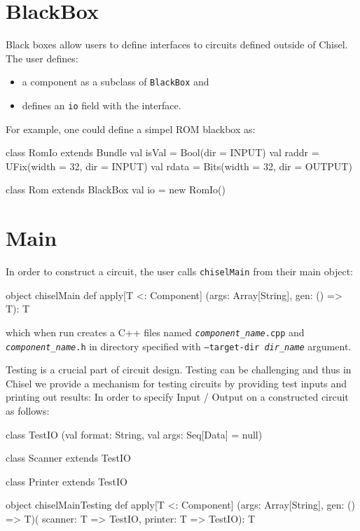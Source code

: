 \documentclass[10pt,twocolumn]{article}
\def\code#1{{\small\tt #1}}
\begin{document}

\section{BlackBox}

Black boxes allow users to define interfaces to circuits defined
outside of Chisel.  The user defines:

\begin{itemize}
\item a component as a subclass of \code{BlackBox} and
\item defines an \code{io} field with the interface.
\end{itemize}

\noindent
For example, one could define a simpel ROM blackbox as:

\begin{scala}
class RomIo extends Bundle {
  val isVal = Bool(dir = INPUT)
  val raddr = UFix(width = 32, dir = INPUT)
  val rdata = Bits(width = 32, dir = OUTPUT)
}

class Rom extends BlackBox {
  val io = new RomIo()
}
\end{scala}

\section{Main}

In order to construct a circuit, 
the user calls \code{chiselMain} from their main object:

\begin{scala}
object chiselMain {
  def apply[T <: Component]
    (args: Array[String], gen: () => T): T
}
\end{scala}

\noindent
which when run creates a C++ files named
\code{{\it component\_name}.cpp} and \code{{\it component\_name}.h} in directory specified with
\code{--target-dir {\it dir\_name}} argument.

Testing is a crucial part of circuit design.
Testing can be challenging and thus in Chisel we provide a mechanism for
testing circuits by providing test inputs and printing out results:
In order to specify Input / Output on a constructed circuit as follows:

\begin{scala}
class TestIO
  (val format: String, 
   val args: Seq[Data] = null)

class Scanner extends TestIO

class Printer extends TestIO

object chiselMainTesting {
  def apply[T <: Component]
    (args: Array[String], gen: () => T)(
     scanner: T => TestIO, 
     printer: T => TestIO): T
}
\end{scala}
\end{document}

